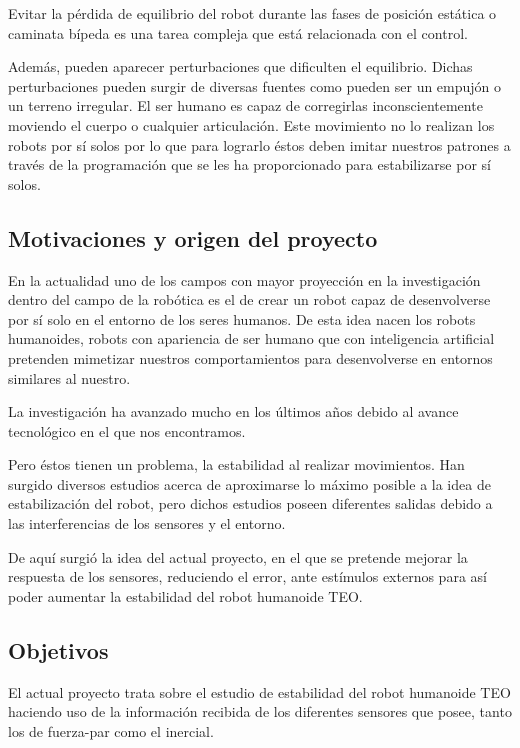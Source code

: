 Evitar la pérdida de equilibrio del robot durante las fases de posición estática o caminata bípeda es una tarea compleja que está relacionada con el control.

Además, pueden aparecer perturbaciones que dificulten el equilibrio. Dichas perturbaciones pueden surgir de diversas fuentes como pueden ser un empujón o un terreno irregular. El ser humano es capaz de corregirlas inconscientemente moviendo el cuerpo o cualquier articulación. Este movimiento no lo realizan los robots por sí solos por lo que para lograrlo éstos deben imitar nuestros patrones a través de la programación que se les ha proporcionado para estabilizarse por sí solos. 


\subsection{Motivaciones y origen del proyecto}

En la actualidad uno de los campos con mayor proyección en la investigación dentro del campo de la robótica es el de crear un robot capaz de desenvolverse por sí solo en el entorno de los seres humanos. De esta idea nacen los robots humanoides, robots con apariencia de ser humano que con inteligencia artificial pretenden mimetizar nuestros comportamientos para desenvolverse en entornos similares al nuestro.

La investigación ha avanzado mucho en  los últimos años debido al avance tecnológico en el que nos encontramos. 

Pero éstos tienen un problema, la estabilidad al realizar movimientos. Han surgido diversos estudios acerca de aproximarse lo máximo posible a la idea de estabilización del robot, pero dichos estudios poseen diferentes salidas debido a las interferencias de los sensores y el entorno. 

De aquí surgió la idea del actual proyecto, en el que se pretende mejorar la respuesta de los sensores, reduciendo el error, ante estímulos externos para así poder aumentar la estabilidad del robot humanoide TEO.

\subsection{Objetivos}

El actual proyecto trata sobre el estudio de estabilidad del robot humanoide TEO haciendo uso de la información recibida de los diferentes sensores que posee, tanto los de fuerza-par como el inercial.

